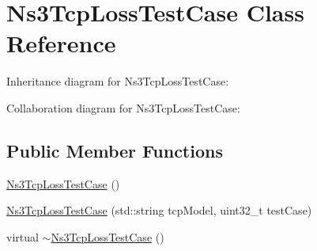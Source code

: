 \hypertarget{classNs3TcpLossTestCase}{}\section{Ns3\+Tcp\+Loss\+Test\+Case Class Reference}
\label{classNs3TcpLossTestCase}


Inheritance diagram for Ns3\+Tcp\+Loss\+Test\+Case\+:


Collaboration diagram for Ns3\+Tcp\+Loss\+Test\+Case\+:
\subsection*{Public Member Functions}
\begin{DoxyCompactItemize}
\item 
\hyperlink{classNs3TcpLossTestCase_ae57e3b847f2071e616327a3038a25f90}{Ns3\+Tcp\+Loss\+Test\+Case} ()
\item 
\hyperlink{classNs3TcpLossTestCase_a0d64199faef844c06846d80c2193b92a}{Ns3\+Tcp\+Loss\+Test\+Case} (std\+::string tcp\+Model, uint32\+\_\+t test\+Case)
\item 
virtual \hyperlink{classNs3TcpLossTestCase_acc85b9650c965a82e9ebd58400d9d718}{$\sim$\+Ns3\+Tcp\+Loss\+Test\+Case} ()
\end{DoxyCompactItemize}
